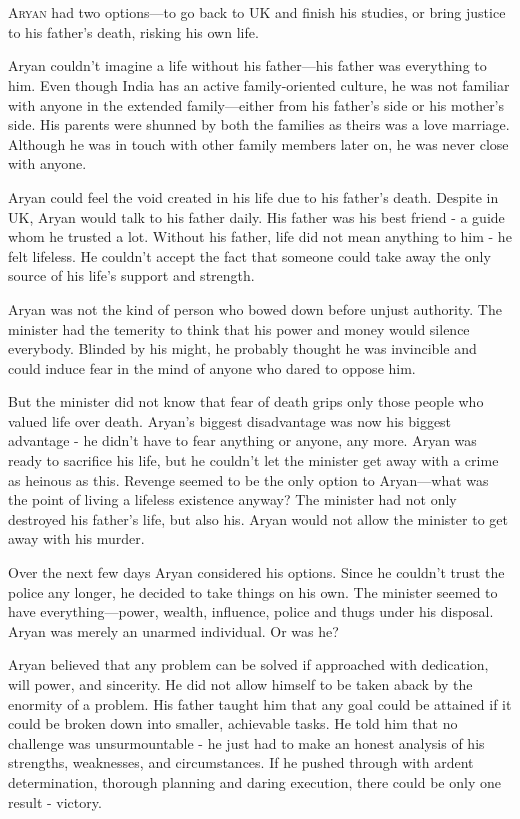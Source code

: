 \chapter{}

\lettrine{A}{ryan} had two options—to go back to UK and finish his studies, or
bring justice to his father's death, risking his own life.

Aryan couldn't imagine a life without his father—his father was everything to
him. Even though India has an active family-oriented culture, he was not
familiar with anyone in the extended family—either from his father's side or
his mother's side. His parents were shunned by both the families as theirs was
a love marriage. Although he was in touch with other family members later on, he
was never close with anyone.

Aryan could feel the void created in his life due to his father's death. Despite
in UK, Aryan would talk to his father daily. His father was his best friend - a
guide whom he trusted a lot. Without his father, life did not mean anything to
him - he felt lifeless. He couldn't accept the fact that someone could take away
the only source of his life's support and strength.

Aryan was not the kind of person who bowed down before unjust authority. The
minister had the temerity to think that his power and money would silence
everybody. Blinded by his might, he probably thought he was invincible and could
induce fear in the mind of anyone who dared to oppose him.

But the minister did not know that fear of death grips only those people who
valued life over death. Aryan's biggest disadvantage was now his biggest
advantage - he didn't have to fear anything or anyone, any more. Aryan was ready
to sacrifice his life, but he couldn't let the minister get away with a crime as
heinous as this. Revenge seemed to be the only option to Aryan—what was the
point of living a lifeless existence anyway? The minister had not only destroyed
his father's life, but also his. Aryan would not allow the minister to get away
with his murder.

Over the next few days Aryan considered his options. Since he couldn't trust the
police any longer, he decided to take things on his own. The minister seemed to
have everything—power, wealth, influence, police and thugs under his disposal.
Aryan was merely an unarmed individual. Or was he?

Aryan believed that any problem can be solved if approached with dedication,
will power, and sincerity. He did not allow himself to be taken aback by the
enormity of a problem. His father taught him that any goal could be attained if
it could be broken down into smaller, achievable tasks. He told him that no
challenge was unsurmountable - he just had to make an honest analysis of his
strengths, weaknesses, and circumstances. If he pushed through with ardent
determination, thorough planning and daring execution, there could be only one
result - victory.

